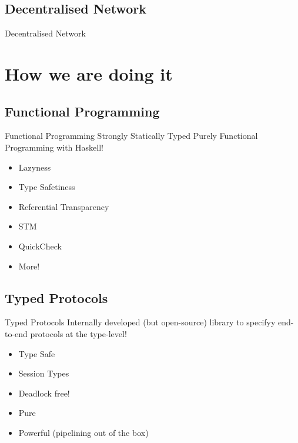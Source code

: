 \documentclass{beamer}
\begin{document}
\subsection*{Decentralised Network}
\begin{frame}{Decentralised Network }
\end{frame}

\section{How we are doing it}

\subsection*{Functional Programming}

\begin{frame}{Functional Programming}
  Strongly Statically Typed Purely Functional Programming with \alert{Haskell}!

  \begin{itemize}
      \item Lazyness
      \item Type Safetiness
      \item Referential Transparency
      \item STM
      \item QuickCheck
      \item More!
  \end{itemize}

\end{frame}

\subsection*{Typed Protocols}

\begin{frame}{Typed Protocols}
  Internally developed (but open-source) library to specifyy end-to-end protocols at the type-level!

  \begin{itemize}
    \item Type Safe
    \item Session Types
    \item \alert{Deadlock free!}
    \item Pure
    \item Powerful (pipelining out of the box)
  \end{itemize}

\end{frame}
\end{document}
